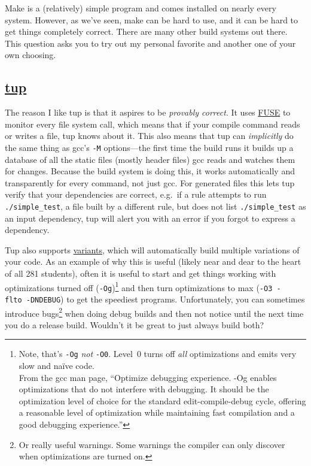 \documentclass{article}
\begin{document}
Make is a (relatively) simple program and comes installed on nearly every
system. However, as we've seen, make can be hard to use, and it can be hard to
get things completely correct. There are many other build systems out there.
This question asks you to try out my personal favorite and another one of your
own choosing.

\subsection{\href{http://gittup.org/tup/}{tup}}
The reason I like tup is that it aspires to be \emph{provably correct}. It
uses \href{https://en.wikipedia.org/wiki/Filesystem_in_Userspace}{FUSE} to
monitor every file system call, which means that if your compile command reads
or writes a file, tup knows about it. This also means that tup can
\emph{implicitly} do the same thing as gcc's \texttt{-M} options---the first
time the build runs it builds up a database of all the static files (mostly
header files) gcc reads and watches them for changes. Because the build system
is doing this, it works automatically and transparently for every command, not
just gcc.  For generated files this lets tup verify that your dependencies are
correct, e.g.\ if a rule attempts to run \texttt{./simple\_test}, a file built
by a different rule, but does not list \texttt{./simple\_test} as an input
dependency, tup will alert you with an error if you forgot to express a
dependency.

Tup also supports \href{http://gittup.org/tup/manual.html#lbAK}{variants},
which will automatically build multiple variations of your code.
%
As an example of why this is useful (likely near and dear to the heart of all
281 students), often it is useful to start and get things working with
optimizations turned off (\texttt{-Og})\footnote{
  Note, that's \texttt{-Og} \emph{not} \texttt{-O0}. Level~0 turns off
  \emph{all} optimizations and emits very slow and na\"ive code.
  \\
  From the gcc man page, ``Optimize debugging experience. -Og enables
  optimizations that do not interfere with debugging. It should be the
  optimization level of choice for the standard edit-compile-debug cycle,
  offering a reasonable level of optimization while maintaining fast
  compilation and a good debugging experience.''
} and then turn optimizations to max (\texttt{-O3~-flto~-DNDEBUG}) to get the
speediest programs. Unfortunately, you can sometimes introduce bugs\footnote{
  Or really useful warnings. Some warnings the compiler can only discover when
  optimizations are turned on.
} when doing debug builds and then not notice until the next time you do a
release build. Wouldn't it be great to just always build both?
\end{document}
